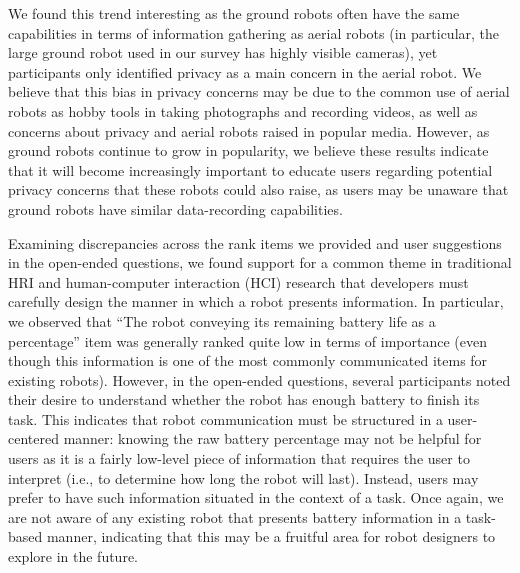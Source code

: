 \documentclass[letterpaper, 10 pt, conference]{ieeeconf}  %
\begin{document}
We found this trend interesting as the ground robots often have the same capabilities in terms of information gathering as aerial robots (in particular, the large ground robot used in our survey has highly visible cameras), yet participants only identified privacy as a main concern in the aerial robot. We believe that this bias in privacy concerns may be due to the common use of aerial robots as hobby tools in taking photographs and recording videos, as well as concerns about privacy and aerial robots raised in popular media. However, as ground robots continue to grow in popularity, we believe these results indicate that it will become increasingly important to educate users regarding potential privacy concerns that these robots could also raise, as users may be unaware that ground robots have similar data-recording capabilities.

Examining discrepancies across the rank items we provided and user suggestions in the open-ended questions, we found support for a common theme in traditional HRI and human-computer interaction (HCI) research that developers must carefully design the manner in which a robot presents information. In particular, we observed that ``The robot conveying its remaining battery life as a percentage'' item was generally ranked quite low in terms of importance (even though this information is one of the most commonly communicated items for existing robots). However, in the open-ended questions, several participants noted their desire to understand whether the robot has enough battery to finish its task. This indicates that robot communication must be structured in a user-centered manner: knowing the raw battery percentage may not be helpful for users as it is a fairly low-level piece of information that requires the user to interpret (i.e., to determine how long the robot will last). Instead, users may prefer to have such information situated in the context of a task. Once again, we are not aware of any existing robot that presents battery information in a task-based manner, indicating that this may be a fruitful area for robot designers to explore in the future. %

\end{document}
